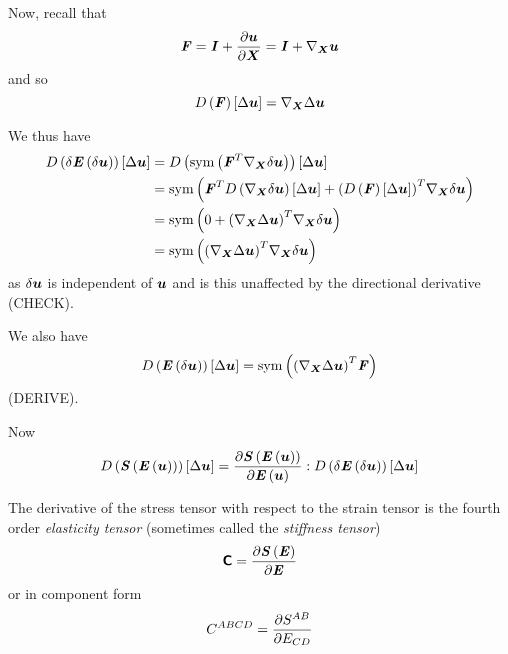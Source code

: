 Now, recall that
\begin{equation}
  \tensortwo{F}=\tensortwo{I}+\delby{\vectr{u}}{\vectr{X}}=\tensortwo{I}+\gradient{\vectr{X}}{\vectr{u}}
\end{equation}
and so
\begin{equation}
  \directionalderiv{\tensortwo{F}}{\Delta\vectr{u}}=\gradient{\vectr{X}}{\Delta\vectr{u}}
\end{equation}

We thus have
\begin{equation}
  \begin{split}
    \directionalderiv{\delta\fnof{\tensortwo{E}}{\delta\vectr{u}}}{\Delta\vectr{u}}&=
    \directionalderiv{\symop\pbrac{\transpose{\tensortwo{F}}\gradient{\vectr{X}}{\delta\vectr{u}}}}{\Delta\vectr{u}}\\
    &=\symop\pbrac{\transpose{\tensortwo{F}}\directionalderiv{\gradient{\vectr{X}}{\delta\vectr{u}}}{\Delta\vectr{u}}+
      \transpose{\pbrac{\directionalderiv{\tensortwo{F}}{\Delta\vectr{u}}}}\gradient{\vectr{X}}{\delta\vectr{u}}}\\
    &=\symop\pbrac{0+\transpose{\pbrac{\gradient{\vectr{X}}{\Delta\vectr{u}}}}\gradient{\vectr{X}}{\delta\vectr{u}}}\\
    &=\symop\pbrac{\transpose{\pbrac{\gradient{\vectr{X}}{\Delta\vectr{u}}}}\gradient{\vectr{X}}{\delta\vectr{u}}}
  \end{split}
\end{equation}
as $\delta\boldsymbol{u}$ is independent of $\boldsymbol{u}$ and is this unaffected by
the directional derivative (CHECK).

We also have
\begin{equation}
  \directionalderiv{\fnof{\tensortwo{E}}{\delta\vectr{u}}}{\Delta\vectr{u}}=
  \symop\pbrac{\transpose{\pbrac{\gradient{\vectr{X}}{\Delta\vectr{u}}}}\tensortwo{F}}
\end{equation}
(DERIVE).

Now
\begin{equation}
     D\left(  \boldsymbol{\mathit{S}}\left(  \boldsymbol{\mathit{E}}\left( \boldsymbol{u} \right)  \right)  \right) \left[ \Delta\boldsymbol{u} \right]  =
   \dfrac{\partial  \boldsymbol{\mathit{S}}\left(  \boldsymbol{\mathit{E}}\left( \boldsymbol{u} \right)  \right) }{\partial  \boldsymbol{\mathit{E}}\left( \boldsymbol{u} \right) } :
       D\left( \delta \boldsymbol{\mathit{E}}\left( \delta\boldsymbol{u} \right)  \right) \left[ \Delta\boldsymbol{u} \right]  
\end{equation}

The derivative of the stress tensor with respect to the strain tensor is the
fourth order \emph{elasticity tensor} (sometimes called the \emph{stiffness
  tensor}) \ie
\begin{equation}
  \boldsymbol{\mathsf{C}}= \dfrac{\partial  \boldsymbol{\mathit{S}}\left( \boldsymbol{\mathit{E}} \right) }{\partial \boldsymbol{\mathit{E}}} 
\end{equation}
or in component form
\begin{equation}
  C^{ABCD}= \dfrac{\partial S^{AB}}{\partial E_{CD}} 
\end{equation}


